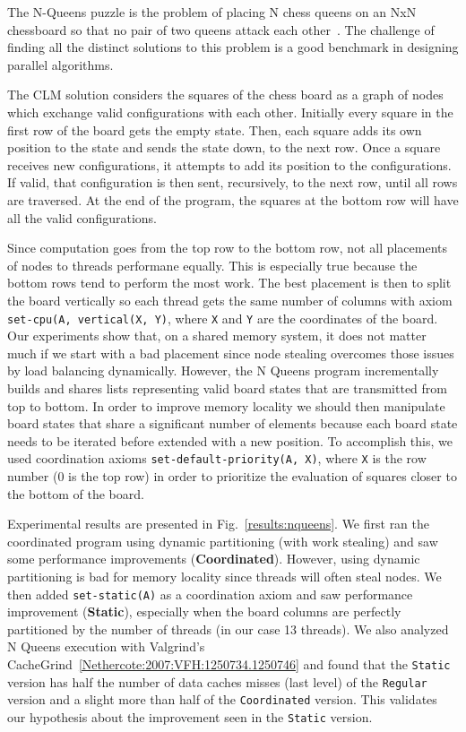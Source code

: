 The N-Queens puzzle is the problem of placing N chess queens on an NxN
chessboard so that no pair of two queens attack each
other~\cite{8queens}. The challenge of finding all the
distinct solutions to this problem is a good benchmark in designing
parallel algorithms.

The CLM solution considers the squares of the chess board as a graph
of nodes which exchange valid configurations with each
other. Initially every square in the first row of the board gets the
empty state.  Then, each square adds its own position to the state and
sends the state down, to the next row. Once a square receives new
configurations, it attempts to add its position to the
configurations. If valid, that configuration is then sent,
recursively, to the next row, until all rows are traversed. At the end
of the program, the squares at the bottom row will have all the valid
configurations.

Since computation goes from the top row to the bottom row, not all
placements of nodes to threads performane equally. This is especially
true because the bottom rows tend to perform the most work. The best
placement is then to split the board vertically so each thread gets
the same number of columns with axiom \texttt{set-cpu(A, vertical(X, Y)}, where
\texttt{X} and \texttt{Y} are the coordinates of the board. Our experiments show that, on a shared
memory system, it does not matter much if we start with a bad
placement since node stealing overcomes those issues by load balancing
dynamically.  However, the N Queens program incrementally builds and shares lists representing
valid board states that are transmitted from top to bottom.
In order to improve memory locality we should then manipulate board
states that share a significant number of elements because each board state
needs to be iterated before extended with a new position.
To accomplish this, we used coordination axioms \texttt{set-default-priority(A,
X)}, where \texttt{X} is the row number (0 is the top row) in order to
prioritize the evaluation of squares closer to the bottom of the board.

Experimental results are presented in Fig.~\ref{results:nqueens}.  We
first ran the coordinated program using dynamic partitioning (with
work stealing) and saw some performance improvements
(\textbf{Coordinated}). However, using dynamic partitioning is bad for
memory locality since threads will often steal nodes.  We then
added \texttt{set-static(A)} as a coordination axiom and saw
performance improvement (\textbf{Static}), especially when the board
columns are perfectly partitioned by the number of threads (in our
case 13 threads). We also analyzed N Queens execution with Valgrind's
CacheGrind~\ref{Nethercote:2007:VFH:1250734.1250746} and found that the
\texttt{Static} version has half the number of data caches misses (last level)
of the \texttt{Regular} version and a slight more than half of the
\texttt{Coordinated} version. This validates our hypothesis about the
improvement seen in the \texttt{Static} version.

